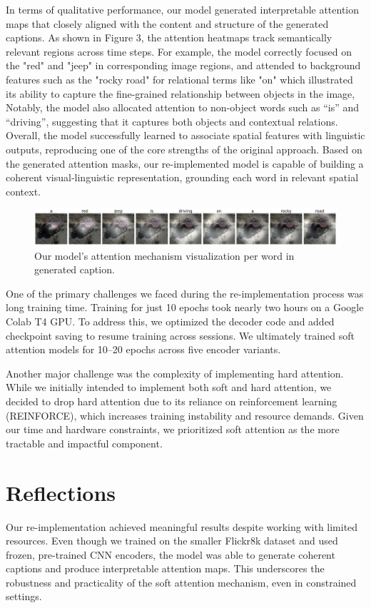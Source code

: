 \documentclass{article}
\begin{document}
In terms of qualitative performance, our model generated interpretable attention maps that closely aligned with the content and structure of the generated captions. As shown in Figure 3, the attention heatmaps track semantically relevant regions across time steps. For example, the model correctly focused on the "red" and "jeep" in corresponding image regions, and attended to background features such as the "rocky road" for relational terms like "on" which illustrated its ability to capture the fine-grained relationship between objects in the image, Notably, the model also allocated attention to non-object words such as “is” and “driving”, suggesting that it captures both objects and contextual relations. Overall, the model successfully learned to associate spatial features with linguistic outputs, reproducing one of the core strengths of the original approach. Based on the generated attention masks, our re-implemented model is capable of building a coherent visual-linguistic representation, grounding each word in relevant spatial context. 

\begin{figure}[h]
    \centering
    \includegraphics[width=0.75\linewidth]{example-jeep.png}
    \caption{Our model's attention mechanism visualization per word in generated caption.}
    \label{fig:enter-label}
\end{figure}

One of the primary challenges we faced during the re-implementation process was long training time. Training for just 10 epochs took nearly two hours on a Google Colab T4 GPU. To address this, we optimized the decoder code and added checkpoint saving to resume training across sessions. We ultimately trained soft attention models for 10–20 epochs across five encoder variants.

Another major challenge was the complexity of implementing hard attention. While we initially intended to implement both soft and hard attention, we decided to drop hard attention due to its reliance on reinforcement learning (REINFORCE), which increases training instability and resource demands. Given our time and hardware constraints, we prioritized soft attention as the more tractable and impactful component.

\section{Reflections}
Our re-implementation achieved meaningful results despite working with limited resources. Even though we trained on the smaller Flickr8k dataset and used frozen, pre-trained CNN encoders, the model was able to generate coherent captions and produce interpretable attention maps. This underscores the robustness and practicality of the soft attention mechanism, even in constrained settings.
\end{document}
